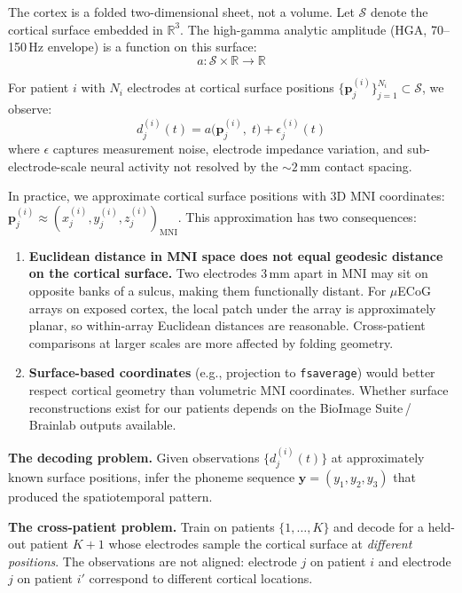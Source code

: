 \documentclass[11pt,letterpaper]{article}
\newcommand{\bfp}{\mathbf{p}}
\newcommand{\bfy}{\mathbf{y}}
\newcommand{\cS}{\mathcal{S}}
\newcommand{\R}{\mathbb{R}}
\begin{document}
The cortex is a folded two-dimensional sheet, not a volume. Let $\cS$ denote the cortical surface embedded in $\R^3$. The high-gamma analytic amplitude (HGA, 70--150\,Hz envelope) is a function on this surface:
\begin{equation}
a: \cS \times \R \to \R
\end{equation}

For patient $i$ with $N_i$ electrodes at cortical surface positions $\{\bfp_j^{(i)}\}_{j=1}^{N_i} \subset \cS$, we observe:
\begin{equation}\label{eq:observation}
\boxed{d_j^{(i)}(t) = a\bigl(\bfp_j^{(i)},\; t\bigr) + \epsilon_j^{(i)}(t)}
\end{equation}
where $\epsilon$ captures measurement noise, electrode impedance variation, and sub-electrode-scale neural activity not resolved by the ${\sim}2$\,mm contact spacing.

In practice, we approximate cortical surface positions with 3D MNI coordinates: $\bfp_j^{(i)} \approx (x_j^{(i)}, y_j^{(i)}, z_j^{(i)})_{\text{MNI}}$. This approximation has two consequences:

\begin{enumerate}[leftmargin=2em]
\item \textbf{Euclidean distance in MNI space does not equal geodesic distance on the cortical surface.} Two electrodes 3\,mm apart in MNI may sit on opposite banks of a sulcus, making them functionally distant. For $\mu$ECoG arrays on exposed cortex, the local patch under the array is approximately planar, so within-array Euclidean distances are reasonable. Cross-patient comparisons at larger scales are more affected by folding geometry.

\item \textbf{Surface-based coordinates} (e.g., projection to \texttt{fsaverage}) would better respect cortical geometry than volumetric MNI coordinates. Whether surface reconstructions exist for our patients depends on the BioImage Suite\,/\,Brainlab outputs available.
\end{enumerate}

\textbf{The decoding problem.} Given observations $\{d_j^{(i)}(t)\}$ at approximately known surface positions, infer the phoneme sequence $\bfy = (y_1, y_2, y_3)$ that produced the spatiotemporal pattern.

\textbf{The cross-patient problem.} Train on patients $\{1, \ldots, K\}$ and decode for a held-out patient $K{+}1$ whose electrodes sample the cortical surface at \emph{different positions}. The observations are not aligned: electrode $j$ on patient $i$ and electrode $j$ on patient $i'$ correspond to different cortical locations.
\end{document}
